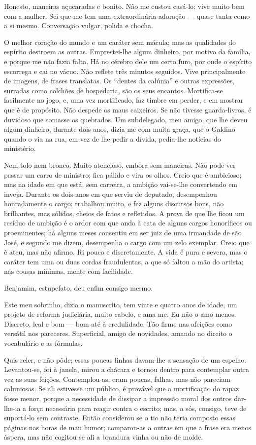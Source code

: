  Honesto, maneiras açucaradas e bonito. Não me custou
casá-lo; vive muito bem com a mulher. Sei que me tem uma extraordinária
adoração --- quase tanta como a si mesmo. Conversação vulgar, polida e
chocha.

 O melhor coração do mundo e um caráter sem mácula;
mas as qualidades do espírito destroem as outras. Emprestei-lhe algum
dinheiro, por motivo da família, e porque me não fazia falta. Há no
cérebro dele um certo furo, por onde o espírito escorrega e cai no
vácuo. Não reflete três minutos seguidos. Vive principalmente de
imagens, de frases translatas. Os ``dentes da calúnia'' e outras
expressões, surradas como colchões de hospedaria, são os seus encantos.
Mortifica-se facilmente no jogo, e, uma vez mortificado, faz timbre em
perder, e em mostrar que é de propósito. Não despede os maus caixeiros.
Se não tivesse guarda-livros, é duvidoso que somasse os quebrados. Um
subdelegado, meu amigo, que lhe deveu algum dinheiro, durante dois anos,
dizia-me com muita graça, que o Galdino quando o via na rua, em vez de
lhe pedir a dívida, pedia-lhe notícias do ministério.

 Nem tolo nem bronco. Muito atencioso, embora sem maneiras.
Não pode ver passar um carro de ministro; fica pálido e vira os olhos.
Creio que é ambicioso; mas na idade em que está, sem carreira, a ambição
vai-se-lhe convertendo em inveja. Durante os dois anos em que serviu de
deputado, desempenhou honradamente o cargo: trabalhou muito, e fez
alguns discursos bons, não brilhantes, mas sólidos, cheios de fatos e
refletidos. A prova de que lhe ficou um resíduo de ambição é o ardor com
que anda à cata de alguns cargos honoríficos ou proeminentes; há alguns
meses consentiu em ser juiz de uma irmandade de são José, e segundo me
dizem, desempenha o cargo com um zelo exemplar. Creio que é ateu, mas
não afirmo. Ri pouco e discretamente. A vida é pura e severa, mas o
caráter tem uma ou duas cordas fraudulentas, a que só faltou a mão do
artista; nas cousas mínimas, mente com facilidade.

Benjamim, estupefato, deu enfim consigo mesmo.

Este meu sobrinho, dizia o manuscrito, tem vinte e quatro anos de idade,
um projeto de reforma judiciária, muito cabelo, e ama-me. Eu não o amo
menos. Discreto, leal e bom --- bom até à credulidade. Tão firme nas
afeições como versátil nos pareceres. Superficial, amigo de novidades,
amando no direito o vocabulário e as fórmulas.

Quis reler, e não pôde; essas poucas linhas davam-lhe a sensação de um
espelho. Levantou-se, foi à janela, mirou a chácara e tornou dentro para
contemplar outra vez as suas feições. Contemplou-as; eram poucas,
falhas, mas não pareciam caluniosas. Se ali estivesse um público, é
provável que a mortificação do rapaz fosse menor, porque a necessidade
de dissipar a impressão moral dos outros dar-lhe-ia a força necessária
para reagir contra o escrito; mas, a sós, consigo, teve de suportá-lo
sem contraste. Então considerou se o tio não teria composto essas
páginas nas horas de mau humor; comparou-as a outras em que a frase era
menos áspera, mas não cogitou se ali a brandura vinha ou não de molde.

